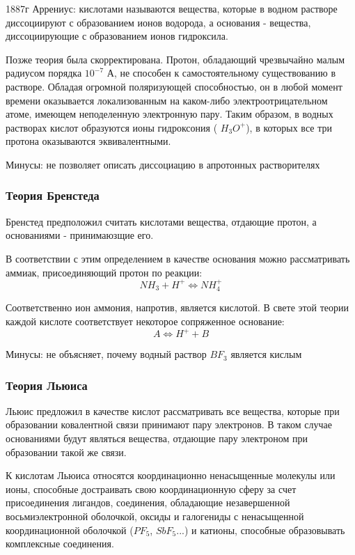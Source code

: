 \documentclass[14pt,a4paper]{scrartcl}
\begin{document}
1887г Аррениус: 
кислотами называются вещества, которые в водном растворе диссоциируют с образованием ионов водорода, а основания - вещества, диссоциирующие с образованием ионов гидроксила.

Позже теория была скорректирована. Протон, обладающий чрезвычайно малым радиусом порядка  $10^{-7} $ А, не способен к самостоятельному существованию в растворе. Обладая огромной поляризующей способностью, он в любой момент времени оказывается локализованным на каком-либо электроотрицательном атоме, имеющем неподеленную электронную пару. Таким образом, в водных растворах кислот образуются ионы гидроксония ( $H_3O^+ $),  в которых все три протона оказываются эквивалентными.

Минусы: не позволяет описать диссоциацию в апротонных растворителях
\subsubsection{Теория Бренстеда}

Бренстед предположил считать кислотами вещества, отдающие протон, а основаниями - принимаюзщие его.

В соответствии с этим определением в качестве основания можно рассматривать аммиак, присоединяющий протон по реакции:
 $$NH_3 + H^+ \Leftrightarrow NH_4^+ $$

Соответственно ион аммония, напротив, является кислотой. В свете этой теории каждой кислоте соответствует некоторое сопряженное основание:
 $$ A \Leftrightarrow H^+ + B$$
 
 Минусы: не объясняет, почему водный раствор $BF_3$ является кислым
 
 \subsubsection{Теория Льюиса}
 
 Льюис предложил в качестве кислот рассматривать все вещества, которые при образовании ковалентной связи принимают пару электронов. В таком случае основаниями будут являться вещества, отдающие пару электроном при образовании такой же связи.
 
 К кислотам Льюиса относятся координационно ненасыщенные молекулы или ионы, способные достраивать свою координационную сферу за счет присоединения лигандов, соединения, обладающие незавершенной восьмиэлектронной оболочкой, оксиды и галогениды с ненасыщенной координационной оболочкой ($PF_5$, $SbF_5$...) и катионы, способные образовывать комплексные соединения.
 
\end{document}
